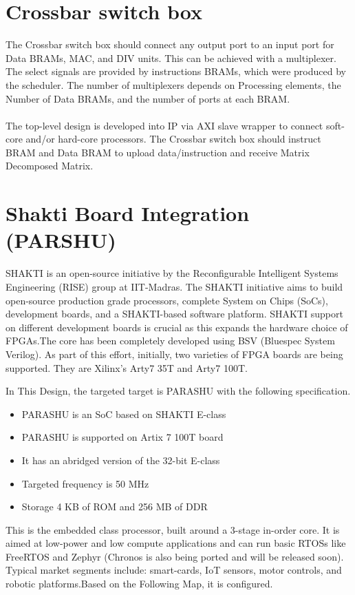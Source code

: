 \section{Crossbar switch box}

The Crossbar switch box should connect any output port to an input port for  Data BRAMs, MAC, and DIV units. This can be achieved with a multiplexer. The select signals are provided by instructions BRAMs, which were produced by the scheduler. The number of multiplexers depends on Processing elements, the Number of Data BRAMs, and the number of ports at each BRAM.
\\
\\
The top-level design is developed into IP via AXI slave wrapper to connect soft-core and/or hard-core processors. The Crossbar switch box should instruct BRAM and Data BRAM to upload data/instruction and receive Matrix Decomposed Matrix.

\section{Shakti Board Integration (PARSHU)}
SHAKTI is an open-source initiative by the Reconfigurable Intelligent Systems Engineering (RISE) group at IIT-Madras. The SHAKTI initiative aims to build open-source production grade processors, complete System on Chips (SoCs), development boards, and a SHAKTI-based software platform. SHAKTI support on different development boards is crucial as this expands the hardware choice of FPGAs.The core has been completely developed using BSV (Bluespec System Verilog). As part of this effort, initially, two varieties of FPGA boards are being supported. They are Xilinx’s Arty7 35T and Arty7 100T.

In This Design, the targeted target is PARASHU\cite{Shakti_PARSHU} with the following specification.
\begin{itemize}
\item PARASHU is an SoC based on SHAKTI E-class \cite{Shakti_Eclass}
\item PARASHU is supported on Artix 7 100T board
\item It has an abridged version of the 32-bit E-class
\item Targeted frequency is 50 MHz
\item Storage 4 KB of ROM and 256 MB of DDR
\end{itemize}

This is the embedded class processor, built around a 3-stage in-order core. It is aimed at low-power and low compute applications and can run basic RTOSs like FreeRTOS and Zephyr (Chronos is also being ported and will be released soon). Typical market segments include: smart-cards, IoT sensors, motor controls, and robotic platforms.Based on the Following Map, it is configured.

